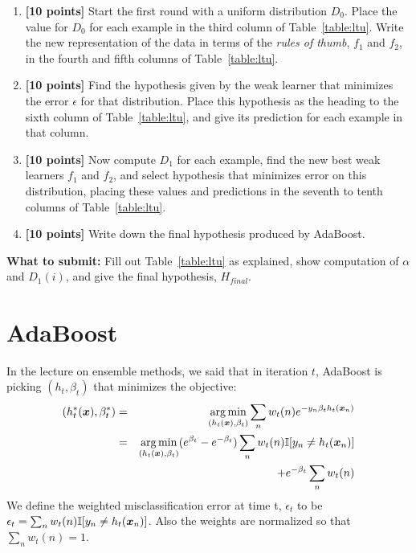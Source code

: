 \documentclass[11pt]{article}
\begin{document}
  \begin{enumerate}
  \item {\bf [10 points]}  Start the first round with a uniform distribution $D_0$.  Place the value for
    $D_0$ for each example in the third column of Table~\ref{table:ltu}.
Write the new representation of the data in terms of the {\em rules of thumb}, $f_1$ and $f_2$, in the fourth and fifth columns of Table~\ref{table:ltu}.

  \item {\bf [10 points]}
    Find the hypothesis given by the weak learner that minimizes the error
    $\epsilon$ for that distribution.  Place this hypothesis as the heading to the
    sixth column of Table~\ref{table:ltu}, and give its prediction for each example in that column.

   \item {\bf [10 points]} Now compute $D_1$ for each example, find the new best weak learners $f_1$ and $f_2$, and select hypothesis that
    minimizes error on this distribution, placing these values and
    predictions in the seventh to tenth columns of Table~\ref{table:ltu}.

  \item {\bf [10 points]} Write down the final hypothesis produced by AdaBoost.

\end{enumerate}

\textbf{What to submit:} Fill out Table~\ref{table:ltu} as explained, show computation of $\alpha$ and $D_1(i)$, and give the final hypothesis, $H_{\textit{final}}$.



\iffalse
\section{AdaBoost }

In the lecture on ensemble methods, we said that in iteration $t$, AdaBoost is picking $(h_t, \beta_t)$ that minimizes the objective:
\begin{eqnarray*}
(h_t^*(\boldsymbol{x}), \beta_t^*) & = & \operatorname*{arg\,min}_{(h_t(\boldsymbol{x}), \beta_t)}\sum_n w_t(n) e^{-y_n \beta_t h_t(\boldsymbol{x}_n)} \\ 
& =& \operatorname*{arg\,min}_{(h_t(\boldsymbol{x}), \beta_t)}(e^{\beta_t}- e^{-\beta_t})  \sum_n w_t(n)\mathbb{I}[y_n \ne h_t(\boldsymbol{x}_n)] \\
&& \qquad\qquad\qquad\qquad\qquad + e^{-\beta_t} \sum_n w_t(n)
\end{eqnarray*}
We define the weighted misclassification error at time t, $\epsilon_t$ to be $\epsilon_t = \sum_n w_t(n)\mathbb{I}[y_n \ne h_t(\boldsymbol{x}_n)]$. Also the weights are normalized so that $\sum_n w_t(n)=1$. 
\end{document}
